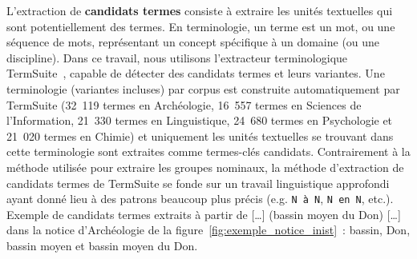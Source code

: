     L'extraction de \textbf{candidats termes} consiste à extraire les unités
    textuelles qui sont potentiellement des termes. En terminologie, un terme
    est un mot, ou une séquence de mots, représentant un concept spécifique à un
    domaine (ou une discipline). Dans ce travail, nous utilisons l'extracteur
    terminologique TermSuite~\cite{rocheteau2011termsuite}, capable de détecter
    des candidats termes et leurs variantes. Une terminologie (variantes
    incluses) par corpus est construite automatiquement par TermSuite (32~119
    termes en Archéologie, 16~557 termes en Sciences de l'Information, 21~330
    termes en Linguistique, 24~680 termes en Psychologie et 21~020 termes en
    Chimie) et uniquement les unités textuelles se trouvant dans cette
    terminologie sont extraites comme termes-clés candidats. Contrairement à la
    méthode utilisée pour extraire les groupes nominaux, la méthode d'extraction
    de candidats termes de TermSuite se fonde sur un travail linguistique
    approfondi ayant donné lieu à des patrons beaucoup plus précis (e.g.
    \texttt{N à N}, \texttt{N en N}, etc.). Exemple de candidats termes extraits
    à partir de \og{}[\dots] (bassin moyen du Don) [\dots]\fg{} dans la notice
    d'Archéologie de la figure~\ref{fig:exemple_notice_inist}~:
    \og{}bassin\fg{}, \og{}Don\fg{}, \og{}bassin moyen\fg{} et \og{}bassin moyen
    du Don\fg{}.
    

